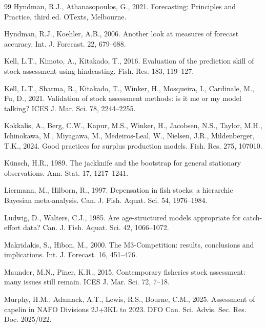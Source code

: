 \begin{thebibliography}{99}
Hyndman, R.J., Athanasopoulos, G., 2021. Forecasting: Principles and Practice, third ed. OTexts, Melbourne.

Hyndman, R.J., Koehler, A.B., 2006. Another look at measures of forecast accuracy. Int. J. Forecast. 22, 679--688.

Kell, L.T., Kimoto, A., Kitakado, T., 2016. Evaluation of the prediction skill of stock assessment using hindcasting. Fish. Res. 183, 119--127.

Kell, L.T., Sharma, R., Kitakado, T., Winker, H., Mosqueira, I., Cardinale, M., Fu, D., 2021. Validation of stock assessment methods: is it me or my model talking? ICES J. Mar. Sci. 78, 2244--2255.

Kokkalis, A., Berg, C.W., Kapur, M.S., Winker, H., Jacobsen, N.S., Taylor, M.H., Ichinokawa, M., Miyagawa, M., Medeiros-Leal, W., Nielsen, J.R., Mildenberger, T.K., 2024. Good practices for surplus production models. Fish. Res. 275, 107010.

K{\"u}nsch, H.R., 1989. The jackknife and the bootstrap for general stationary observations. Ann. Stat. 17, 1217--1241.

Liermann, M., Hilborn, R., 1997. Depensation in fish stocks: a hierarchic Bayesian meta-analysis. Can. J. Fish. Aquat. Sci. 54, 1976--1984.

Ludwig, D., Walters, C.J., 1985. Are age-structured models appropriate for catch-effort data? Can. J. Fish. Aquat. Sci. 42, 1066--1072.

Makridakis, S., Hibon, M., 2000. The M3-Competition: results, conclusions and implications. Int. J. Forecast. 16, 451--476.

Maunder, M.N., Piner, K.R., 2015. Contemporary fisheries stock assessment: many issues still remain. ICES J. Mar. Sci. 72, 7--18.

Murphy, H.M., Adamack, A.T., Lewis, R.S., Bourne, C.M., 2025. Assessment of capelin in NAFO Divisions 2J+3KL to 2023. DFO Can. Sci. Advis. Sec. Res. Doc. 2025/022.


\end{thebibliography}
